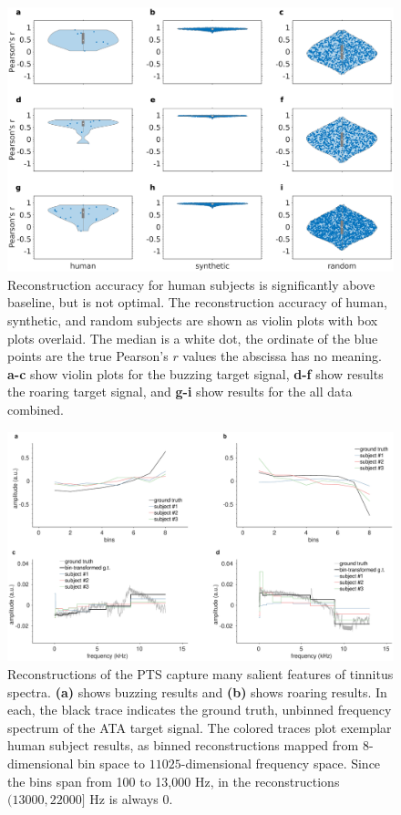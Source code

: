 \documentclass[journal]{IEEEtran}
\begin{document}
\begin{figure}[ht]
    \centering
    \includegraphics[width=\linewidth]{reconstruction_violin_1.eps}
    \caption{Reconstruction accuracy for human subjects
    is significantly above baseline, but is not optimal.
    The reconstruction accuracy of human, synthetic, and random subjects
    are shown as violin plots with box plots overlaid. The median is a white dot,
    the ordinate of the blue points are the true Pearson's $r$ values \textemdash{}
    the abscissa has no meaning.
    \textbf{a-c} show violin plots for the buzzing target signal, 
    \textbf{d-f} show results the roaring target signal,
    and \textbf{g-i} show results for the all data combined.}
    \label{fig:reconstructions}
\end{figure}

\begin{figure}[ht]
    \centering
    \includegraphics[width=\linewidth]{reconstructions.eps}
    \caption{Reconstructions of the PTS capture many salient features
    of tinnitus spectra. \textbf{(a)} shows buzzing results and \textbf{(b)}
    shows roaring results. In each, the black trace indicates the ground truth,
    unbinned frequency spectrum of the ATA target signal. The colored traces
    plot exemplar human subject results, as binned reconstructions mapped
    from $8$-dimensional bin space to $11025$-dimensional frequency space.
    Since the bins span from 100 to 13,000 Hz, 
    in the reconstructions $(13000, 22000]$ Hz is always $0$.}
    \label{fig:spectra}
\end{figure}
\end{document}
